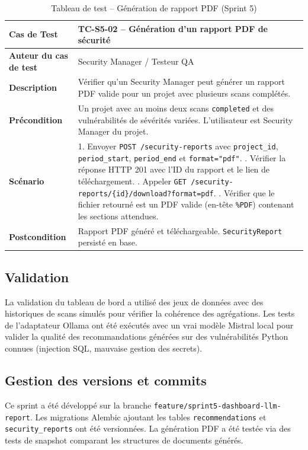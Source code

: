 \begin{table}[H]
\centering
\caption{Tableau de test -- Génération de rapport PDF (Sprint 5)}
\label{tab:test-sprint5-report}
\small
\renewcommand{\arraystretch}{1.3}
\begin{tabularx}{\textwidth}{>{\bfseries}p{3.5cm} X}
\hline
Cas de Test & TC-S5-02 -- Génération d'un rapport PDF de sécurité \\
\hline
Auteur du cas de test & Security Manager / Testeur QA \\
\hline
Description & Vérifier qu'un Security Manager peut générer un rapport PDF valide pour un projet avec plusieurs scans complétés. \\
\hline
Précondition & Un projet avec au moins deux scans \texttt{completed} et des vulnérabilités de sévérités variées. L'utilisateur est Security Manager du projet. \\
\hline
Scénario &
1. Envoyer \texttt{POST /security-reports} avec \texttt{project\_id}, \texttt{period\_start}, \texttt{period\_end} et \texttt{format="pdf"}. \newline
2. Vérifier la réponse HTTP 201 avec l'ID du rapport et le lien de téléchargement. \newline
3. Appeler \texttt{GET /security-reports/\{id\}/download?format=pdf}. \newline
4. Vérifier que le fichier retourné est un PDF valide (en-tête \texttt{\%PDF}) contenant les sections attendues. \\
\hline
Postcondition & Rapport PDF généré et téléchargeable. \texttt{SecurityReport} persisté en base. \\
\hline
\end{tabularx}
\end{table}

\subsection{Validation}
La validation du tableau de bord a utilisé des jeux de données avec des historiques de scans simulés pour vérifier la cohérence des agrégations. Les tests de l'adaptateur Ollama ont été exécutés avec un vrai modèle Mistral local pour valider la qualité des recommandations générées sur des vulnérabilités Python connues (injection SQL, mauvaise gestion des secrets).

\subsection{Gestion des versions et commits}
Ce sprint a été développé sur la branche \texttt{feature/sprint5-dashboard-llm-report}. Les migrations Alembic ajoutant les tables \texttt{recommendations} et \texttt{security\_reports} ont été versionnées. La génération PDF a été testée via des tests de snapshot comparant les structures de documents générés.

